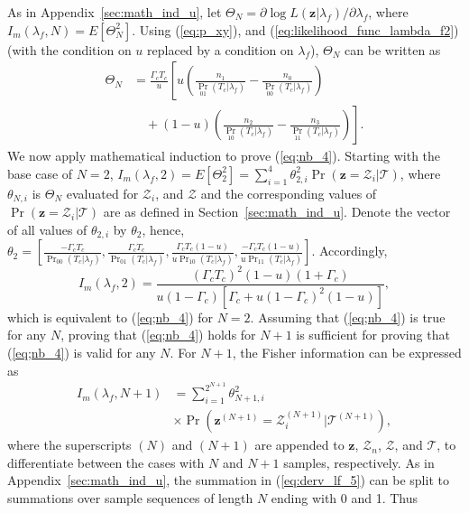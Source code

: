 \documentclass[11pt,draftclsnofoot,journal,onecolumn]{IEEEtran}
\begin{document}
\begin{IEEEproof} As in Appendix~\ref{sec:math_ind_u}, let $\Theta_N = \partial \log L(\boldsymbol{z}|\lambda_{f})/\partial \lambda_{f}$, where $I_m\left(\lambda_f,N\right) = E\left[\Theta_N^2\right]$. Using (\ref{eq:p_xy}), and (\ref{eq:likelihood_func_lambda_f2}) (with the condition on $u$ replaced by a condition on $\lambda_f$), $\Theta_N$ can be written as
\begin{align}
\Theta_N & = \frac{\Gamma_c T_c}{u} \left[ u \left( \frac{n_1}{\textstyle\Pr_{01}(T_c|\lambda_f)} - \frac{n_0}{\textstyle\Pr_{00}(T_c|\lambda_f)} \right)\nonumber\right.\\&\left.\quad + (1-u) \left( \frac{n_2}{\textstyle\Pr_{10}(T_c|\lambda_f)} - \frac{n_3}{\textstyle\Pr_{11}(T_c|\lambda_f)}\right) \right].
\label{eq:derv_lf_3}
\end{align}
We now apply mathematical induction to prove (\ref{eq;nb_4}). Starting with the base case of $N = 2$, $I_m\left(\lambda_f,2\right) = E\left[\Theta_2^2\right] = \sum_{i=1}^{4} \theta_{2,i}^2 \Pr(\boldsymbol{z} = \mathcal{Z}_i|\mathcal{T})$, where $\theta_{N,i}$ is $\Theta_N$ evaluated for $\mathcal{Z}_i$, and $\mathcal{Z}$ and the corresponding values of $\Pr(\boldsymbol{z} = \mathcal{Z}_i|\mathcal{T})$ are as defined in Section~\ref{sec:math_ind_u}. Denote the vector of all values of $\theta_{2,i}$ by $\theta_{2}$, hence, $\theta_{2} = \left[ \frac{- \Gamma_c T_c}{\textstyle\Pr_{00}(T_c|\lambda_f)},\frac{\Gamma_c T_c}{\textstyle\Pr_{01}(T_c|\lambda_f)}, \frac{\Gamma_c T_c (1-u)}{u\textstyle\Pr_{10}(T_c|\lambda_f)},\frac{-\Gamma_c T_c (1-u)}{u\textstyle\Pr_{11}(T_c|\lambda_f)} \right]$. Accordingly, 
\begin{equation}
I_m\left(\lambda_f,2\right)=\frac{(\Gamma_c T_c)^2(1-u)(1+\Gamma_c)}{u(1-\Gamma_c)[\Gamma_c + u(1-\Gamma_c)^2(1-u)]},
\label{sec:I_m_2}
\end{equation}
which is equivalent to (\ref{eq;nb_4}) for $N=2$. Assuming that (\ref{eq;nb_4}) is true for any $N$, proving that (\ref{eq;nb_4}) holds for $N+1$ is sufficient for proving that (\ref{eq;nb_4}) is valid for any $N$. For $N+1$, the Fisher information can be expressed as
\begin{align}
I_m(\lambda_f,N+1)& = \sum_{i=1}^{2^{N+1}} \theta_{N+1,i}^2\nonumber\\&\times \Pr(\boldsymbol{z}^{(N+1)} = \mathcal{Z}_i^{(N+1)}|\mathcal{T}^{(N+1)}),
\label{eq:derv_lf_5}
\end{align}
where the superscripts $(N)$ and $(N+1)$ are appended to $\boldsymbol{z}$, $\mathcal{Z}_n$, $\mathcal{Z}$, and $\mathcal{T}$, to differentiate between the cases with $N$ and $N+1$ samples, respectively. As in Appendix~\ref{sec:math_ind_u}, the summation in (\ref{eq:derv_lf_5}) can be split to summations over sample sequences of length $N$ ending with 0 and 1. Thus

\end{IEEEproof}
\end{document}
